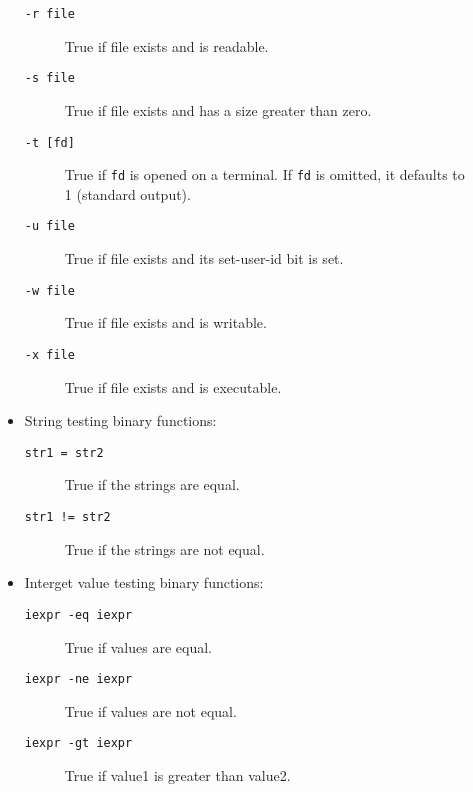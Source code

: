 \begin{description}
\begin{itemize}
\begin{description}
\item[{\tt -r file}] \mbox{}

True if file exists and is readable.

\item[{\tt -s file}] \mbox{}

True if file exists and has a size greater than zero.

\item[{\tt -t [fd]}] \mbox{}

True if {\tt fd} is opened on a terminal. 
If {\tt fd} is omitted, it defaults to 1 (standard output).

\item[{\tt -u file}] \mbox{}

True if file exists and its set-user-id bit is set.

\item[{\tt -w file}] \mbox{}

True if file exists and is writable.

\item[{\tt -x file}] \mbox{}

True if file exists and is executable.

\end{description}

\item String testing binary functions:
\begin{description}
\item[{\tt str1 = str2}] \mbox{}

True if the strings are equal.

\item[{\tt str1 != str2}] \mbox{}

True if the strings are not equal.

\end{description}

\item Interget value testing binary functions:
\begin{description}
\item[{\tt iexpr -eq iexpr}] \mbox{}

True if values are equal.

\item[{\tt iexpr -ne iexpr}] \mbox{}

True if values are not equal.

\item[{\tt iexpr -gt iexpr}] \mbox{}

True if value1 is greater than value2.


\end{description}
\end{itemize}
\end{description}
